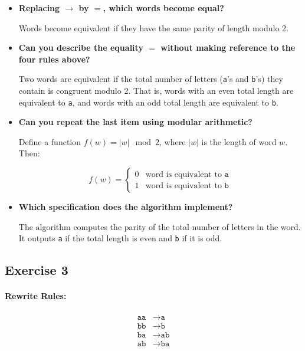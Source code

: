 \documentclass{article}
\theoremstyle{theorem}
\theoremstyle{definition}
\theoremstyle{remark}
\begin{document}
\begin{itemize}
    \item \textbf{Replacing \(\to\) by \(=\), which words become equal?}

    Words become equivalent if they have the same parity of length modulo 2.

    \item \textbf{Can you describe the equality \(=\) without making reference to the four rules above?}

    Two words are equivalent if the total number of letters (\texttt{a}'s and \texttt{b}'s) they contain is congruent modulo 2. That is, words with an even total length are equivalent to \texttt{a}, and words with an odd total length are equivalent to \texttt{b}.

    \item \textbf{Can you repeat the last item using modular arithmetic?}

    Define a function \( f(w) = |w| \mod 2 \), where \(|w|\) is the length of word \( w \). Then:

    \[
    f(w) = \begin{cases}
    0 & \text{word is equivalent to } \texttt{a} \\
    1 & \text{word is equivalent to } \texttt{b}
    \end{cases}
    \]

    \item \textbf{Which specification does the algorithm implement?}

    The algorithm computes the parity of the total number of letters in the word. It outputs \texttt{a} if the total length is even and \texttt{b} if it is odd.
\end{itemize}

\subsection*{Exercise 3}

\paragraph{Rewrite Rules:}

\[
\begin{aligned}
\texttt{aa} &\to \texttt{a} \\
\texttt{bb} &\to \texttt{b} \\
\texttt{ba} &\to \texttt{ab} \\
\texttt{ab} &\to \texttt{ba}
\end{aligned}
\]
\end{document}
